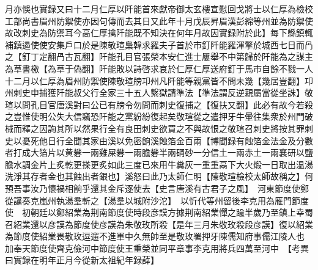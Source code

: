 月亦悞也實録又曰十二月仁厚以阡能首來獻帝御太玄樓宣慰回戈將士以仁厚為檢校工部尚書眉州防禦使亦因句傳而去其日又此年十月戊辰昇眉漢彭綿等州並為防禦使故改刺史為防禦耳今高仁厚擒阡能既不知決在何年月故因實録附於此】每下縣鎮輒補鎮遏使使安集戶口於是陳敬瑄梟韓求羅夫子首於市釘阡能羅渾擎於城西七日而冎之【釘丁定翻冎古瓦翻】阡能孔目官張榮本安仁進士屢舉不中第歸於阡能為之謀主為草書檄【為草于偽翻】阡能敗以詩啓求哀於仁厚仁厚送府釘于馬市自餘不戮一人十二月以仁厚為眉州防禦使陳敬瑄牓卭州凡阡能等親黨皆不問未幾【幾居豈翻】卭州刺史申捕獲阡能叔父行全家三十五人繫獄請準法【準法謂反逆親屬當從坐誅】敬瑄以問孔目官唐溪對曰公已有牓令勿問而刺史復捕之【復扶又翻】此必有故今若殺之豈惟使明公失大信竊恐阡能之黨紛紛復起矣敬瑄從之遣押牙牛暈往集衆於州門破械而釋之因詢其所以然果行全有良田刺史欲買之不與故恨之敬瑄召刺史將按其罪刺史以憂死他日行全聞其家由溪以免密餉溪蝕箔金百兩【博聞録有蝕箔金法金及分數者打成大箔片以黄礬一兩雞屎礬一兩膽礬半兩碙砂一分信土一兩赤土一兩襄研以鹽膽水調金片上炙乾更搽更炙如此三度已來用牛糞灰一重重鬲下大火煅一日取出温湯洗淨其存者金也其蝕出者銀也】溪怒曰此乃太師仁明【陳敬瑄檢校太師故稱之】何預吾事汝乃懷禍相餉乎還其金斥逐使去【史言唐溪有古君子之風】　河東節度使鄭從讜奏克嵐州執湯羣斬之【湯羣以城附沙沱】　以忻代等州留後李克用為雁門節度使　初朝廷以鄭紹業為荆南節度使時段彦謨方據荆南紹業憚之踰半歲乃至鎮上幸蜀召紹業還以彦謨為節度使彦謨為朱敬玫所殺【是年三月朱敬玫殺段彦謨】復以紹業為節度使紹業畏敬玫逗遛不進軍中久無帥至是敬玫署押牙陳儒知府事儒江陵人也　加奉天節度使齊克儉河中節度使王重榮並同平章事李克用將兵四萬至河中　【考異曰實録在明年正月今從新太祖紀年録薛】

